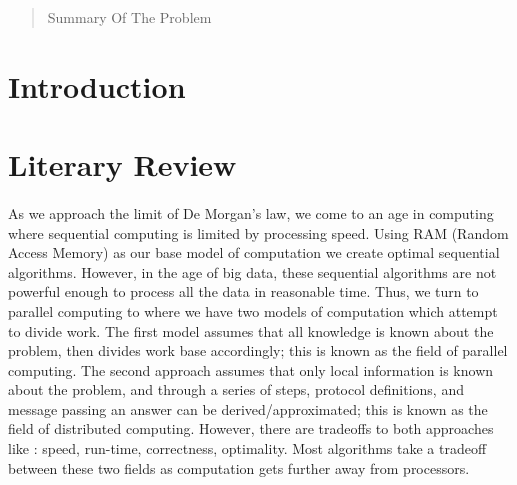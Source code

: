 \documentclass[]{article}
\begin{document}
\maketitle
\begin{abstract}
Summary Of The Problem
\end{abstract}
\section{Introduction}

\section{Literary Review}
\paragraph{}
As we approach the limit of De Morgan's law, we come to an age in computing where sequential computing is limited by processing speed. Using RAM (Random Access Memory) as our base model of computation we create optimal sequential algorithms. However, in the age of big data, these sequential algorithms are not powerful enough to process all the data in reasonable time. Thus, we turn to parallel computing to where we have two models of computation which attempt to divide work. The first model assumes that all knowledge is known about the problem, then divides work base accordingly; this is known as the field of parallel computing. The second approach assumes that only local information is known about the problem, and through a series of steps, protocol definitions, and message passing an answer can be derived/approximated; this is known as the field of distributed computing. However, there are tradeoffs to both approaches like : speed, run-time, correctness, optimality. Most algorithms take a tradeoff between these two fields as computation gets further away from processors.
\end{document}
